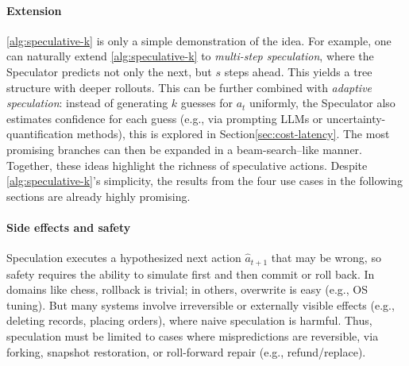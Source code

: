 \paragraph{Extension} \cref{alg:speculative-k} is only a simple demonstration of the idea. For example, one can naturally extend \cref{alg:speculative-k} to \emph{multi-step speculation}, where the Speculator predicts not only the next, but $s$ steps ahead. This yields a tree structure with deeper rollouts. This can be further combined with \emph{adaptive speculation}: instead of generating $k$ guesses for $a_t$ uniformly, the Speculator also estimates confidence for each guess (e.g., via prompting LLMs or uncertainty-quantification methods), this is explored in Section\ref{sec:cost-latency}. The most promising branches can then be expanded in a beam-search–like manner. Together, these ideas highlight the richness of speculative actions. Despite \cref{alg:speculative-k}'s simplicity, the results from the four use cases in the following sections are already highly promising.


\paragraph{Side effects and safety}
Speculation executes a hypothesized next action $\hat a_{t+1}$ that may be wrong, so safety requires the ability to simulate first and then commit or roll back. In domains like chess, rollback is trivial; in others, overwrite is easy (e.g., OS tuning). But many systems involve irreversible or externally visible effects (e.g., deleting records, placing orders), where naive speculation is harmful. Thus, speculation must be limited to cases where mispredictions are reversible, via forking, snapshot restoration, or roll-forward repair (e.g., refund/replace).